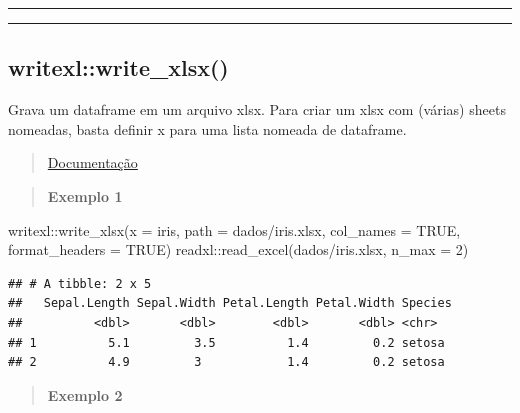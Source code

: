 \documentclass[
]{book}
\newenvironment{Shaded}{\begin{snugshade}}{\end{snugshade}}
\newcommand{\AttributeTok}[1]{\textcolor[rgb]{0.77,0.63,0.00}{#1}}
\newcommand{\ConstantTok}[1]{\textcolor[rgb]{0.00,0.00,0.00}{#1}}
\newcommand{\DecValTok}[1]{\textcolor[rgb]{0.00,0.00,0.81}{#1}}
\newcommand{\FunctionTok}[1]{\textcolor[rgb]{0.00,0.00,0.00}{#1}}
\newcommand{\NormalTok}[1]{#1}
\newcommand{\SpecialCharTok}[1]{\textcolor[rgb]{0.00,0.00,0.00}{#1}}
\newcommand{\StringTok}[1]{\textcolor[rgb]{0.31,0.60,0.02}{#1}}
\theoremstyle{definition}
\theoremstyle{definition}
\theoremstyle{definition}
\theoremstyle{definition}
\theoremstyle{remark}
\begin{document}
\begin{center}\rule{0.5\linewidth}{0.5pt}\end{center}

\begin{center}\rule{0.5\linewidth}{0.5pt}\end{center}

\hypertarget{writexlwrite_xlsx}{%
\subsection{writexl::write\_xlsx()}\label{writexlwrite_xlsx}}

Grava um dataframe em um arquivo xlsx. Para criar um xlsx com (várias) sheets nomeadas, basta definir x para uma lista nomeada de dataframe.

\begin{quote}
\href{https://www.rdocumentation.org/packages/writexl/versions/1.4.0/topics/write_xlsx}{Documentação}
\end{quote}

\begin{quote}
\textbf{Exemplo 1}
\end{quote}

\begin{Shaded}
\begin{Highlighting}[]
\NormalTok{writexl}\SpecialCharTok{::}\FunctionTok{write\_xlsx}\NormalTok{(}\AttributeTok{x =}\NormalTok{ iris,}
                    \AttributeTok{path =} \StringTok{\textquotesingle{}dados/iris.xlsx\textquotesingle{}}\NormalTok{,}
                    \AttributeTok{col\_names =} \ConstantTok{TRUE}\NormalTok{,}
                    \AttributeTok{format\_headers =} \ConstantTok{TRUE}\NormalTok{)}
\NormalTok{readxl}\SpecialCharTok{::}\FunctionTok{read\_excel}\NormalTok{(}\StringTok{\textquotesingle{}dados/iris.xlsx\textquotesingle{}}\NormalTok{, }\AttributeTok{n\_max =} \DecValTok{2}\NormalTok{)}
\end{Highlighting}
\end{Shaded}

\begin{verbatim}
## # A tibble: 2 x 5
##   Sepal.Length Sepal.Width Petal.Length Petal.Width Species
##          <dbl>       <dbl>        <dbl>       <dbl> <chr>  
## 1          5.1         3.5          1.4         0.2 setosa 
## 2          4.9         3            1.4         0.2 setosa
\end{verbatim}

\begin{quote}
\textbf{Exemplo 2}
\end{quote}
\end{document}
